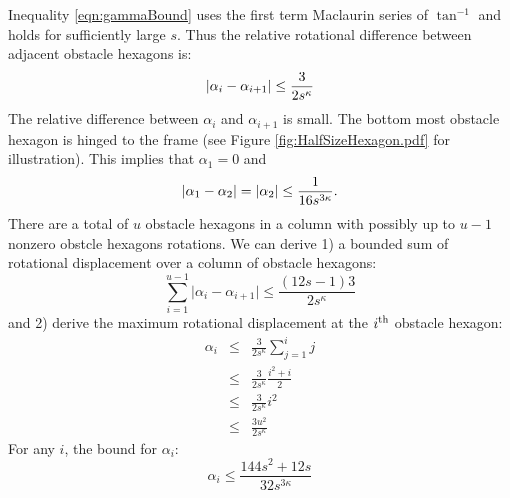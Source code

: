Inequality \ref{eqn:gammaBound} uses the first term Maclaurin series of $\tan^{-1}$ and holds for sufficiently large $s$.
Thus the relative rotational difference between adjacent obstacle hexagons is:
\begin{equation}\label{eqn:angularBound}
\left\vert \alpha_i - \alpha_{i+1} \right\vert \leq \frac{3}{2s^{\kappa}}\\
\end{equation}
The relative difference between $\alpha_i$ and $\alpha_{i+1}$ is small.
The bottom most obstacle hexagon is hinged to the frame (see Figure \ref{fig:HalfSizeHexagon.pdf} for illustration). 
This implies that $\alpha_1 = 0$ and
$$\left\vert \alpha_1 - \alpha_2 \right\vert=\left\vert \alpha_2 \right\vert\leq \frac{1}{16s^{3\kappa}}.$$
There are a total of $u$ obstacle hexagons in a column with possibly up to $u-1$ nonzero obstcle hexagons rotations.
We can derive 1) a bounded sum of rotational displacement over a column of obstacle hexagons:
\begin{equation}\label{eqn:angularSumBound}
\sum_{i=1}^{u-1} \vert \alpha_i - \alpha_{i+1} \vert \leq \frac{(12s-1)3}{2s^{\kappa}}
\end{equation}
and 2) derive the maximum rotational displacement at the $i^\text{th}$ obstacle hexagon:
\begin{eqnarray*}
\alpha_i &\leq& \frac{3}{2s^\kappa} \sum_{j=1}^i j\\
		 &\leq& \frac{3}{2s^\kappa}  \frac{i^2+i}{2}\\
		 &\leq& \frac{3}{2s^\kappa}  i^2\\
		 &\leq& \frac{3 u^2}{2s^\kappa}
\end{eqnarray*}
For any $i$, the bound for $\alpha_i$:
\begin{equation}\label{eqn:angularMaxBound}
\alpha_i \leq \frac{144s^2+12s}{32s^{3\kappa}}
\end{equation}

